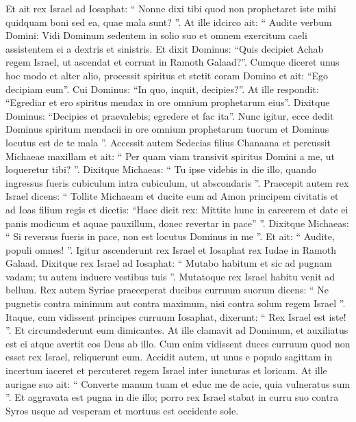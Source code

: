 \begin{biblechapter}
\begin{biblechapter}
\begin{biblechapter}
\begin{biblechapter}
\begin{biblechapter}
\begin{biblechapter}
\begin{biblechapter}
\begin{biblechapter}
\begin{biblechapter}
\begin{biblechapter}
\begin{biblechapter}
\begin{biblechapter}
\begin{biblechapter}
\begin{biblechapter}
\begin{biblechapter}
\begin{biblechapter}
\begin{biblechapter}
\begin{biblechapter}
 \verse Et ait rex Israel ad Iosaphat: “ Nonne dixi tibi quod non prophetaret iste mihi quidquam boni sed ea, quae mala sunt? ”.
 \verse At ille idcirco ait: “ Audite verbum Domini: Vidi Dominum sedentem in solio suo et omnem exercitum caeli assistentem ei a dextris et sinistris. 
\verse Et dixit Dominus: “Quis decipiet Achab regem Israel, ut ascendat et corruat in Ramoth Galaad?”. Cumque diceret unus hoc modo et alter alio, 
\verse processit spiritus et stetit coram Domino et ait: “Ego decipiam eum”. Cui Dominus: “In quo, inquit, decipies?”. 
\verse At ille respondit: “Egrediar et ero spiritus mendax in ore omnium prophetarum eius”. Dixitque Dominus: “Decipies et praevalebis; egredere et fac ita”. 
\verse Nunc igitur, ecce dedit Dominus spiritum mendacii in ore omnium prophetarum tuorum et Dominus locutus est de te mala ”.
 \verse Accessit autem Sedecias filius Chanaana et percussit Michaeae maxillam et ait: “ Per quam viam transivit spiritus Domini a me, ut loqueretur tibi? ”. 
\verse Dixitque Michaeas: “ Tu ipse videbis in die illo, quando ingressus fueris cubiculum intra cubiculum, ut abscondaris ”. 
\verse Praecepit autem rex Israel dicens: “ Tollite Michaeam et ducite eum ad Amon principem civitatis et ad Ioas filium regis 
\verse et dicetis: “Haec dicit rex: Mittite hunc in carcerem et date ei panis modicum et aquae pauxillum, donec revertar in pace” ”. 
\verse Dixitque Michaeas: “ Si reversus fueris in pace, non est locutus Dominus in me ”. Et ait: “ Audite, populi omnes! ”.
 \verse Igitur ascenderunt rex Israel et Iosaphat rex Iudae in Ramoth Galaad. 
\verse Dixitque rex Israel ad Iosaphat: “ Mutabo habitum et sic ad pugnam vadam; tu autem induere vestibus tuis ”. Mutatoque rex Israel habitu venit ad bellum.
 \verse Rex autem Syriae praeceperat ducibus curruum suorum dicens: “ Ne pugnetis contra minimum aut contra maximum, nisi contra solum regem Israel ”. 
\verse Itaque, cum vidissent principes curruum Iosaphat, dixerunt: “ Rex Israel est iste! ”. Et circumdederunt eum dimicantes. At ille clamavit ad Dominum, et auxiliatus est ei atque avertit eos Deus ab illo. 
\verse Cum enim vidissent duces curruum quod non esset rex Israel, reliquerunt eum. 
\verse Accidit autem, ut unus e populo sagittam in incertum iaceret et percuteret regem Israel inter iuncturas et loricam. At ille aurigae suo ait: “ Converte manum tuam et educ me de acie, quia vulneratus sum ”. 
\verse Et aggravata est pugna in die illo; porro rex Israel stabat in curru suo contra Syros usque ad vesperam et mortuus est occidente sole.
 

\end{biblechapter}
\end{biblechapter}
\end{biblechapter}
\end{biblechapter}
\end{biblechapter}
\end{biblechapter}
\end{biblechapter}
\end{biblechapter}
\end{biblechapter}
\end{biblechapter}
\end{biblechapter}
\end{biblechapter}
\end{biblechapter}
\end{biblechapter}
\end{biblechapter}
\end{biblechapter}
\end{biblechapter}
\end{biblechapter}
